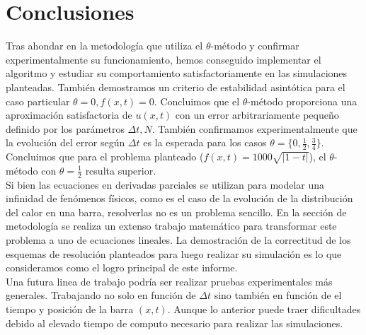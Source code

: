 \documentclass{endm}
\begin{document}
\section{Conclusiones}\label{Conclusions}
Tras ahondar en la metodología que utiliza el $\theta$-método y confirmar experimentalmente su funcionamiento, hemos conseguido implementar el algoritmo y estudiar su comportamiento satisfactoriamente en las simulaciones planteadas. También demostramos un criterio de estabilidad asintótica para el caso particular $\theta=0, f(x,t)=0$. Concluimos que el $\theta$-método proporciona una aproximación satisfactoria de $u(x,t)$ con un error arbitrariamente pequeño definido por los parámetros $\Delta t, N$. También confirmamos experimentalmente que la evolución del error según $\Delta t$ es la esperada para los casos $\theta=\{0,\frac{1}{2},\frac{3}{4}\}$. Concluimos que para el problema planteado ($f(x,t)=1000\sqrt{|1-t|}$), el $\theta$-método con $\theta=\frac{1}{2}$ resulta superior.\\
Si bien las ecuaciones en derivadas parciales se utilizan para modelar una infinidad de fenómenos físicos, como es el caso de la evolución de la distribución del calor en una barra, resolverlas no es un problema sencillo. En la sección de metodología se realiza un extenso trabajo matemático para transformar este problema a uno de ecuaciones lineales. La demostración de la correctitud de los esquemas de resolución planteados para luego realizar su simulación es lo que consideramos como el logro principal de este informe.\\
Una futura linea de trabajo podría ser realizar pruebas experimentales más generales. Trabajando no solo en función de $\Delta t$ sino también en función de el tiempo y posición de la barra $(x,t)$. Aunque lo anterior puede traer dificultades debido al elevado tiempo de computo necesario para realizar las simulaciones.

%



\end{document}
